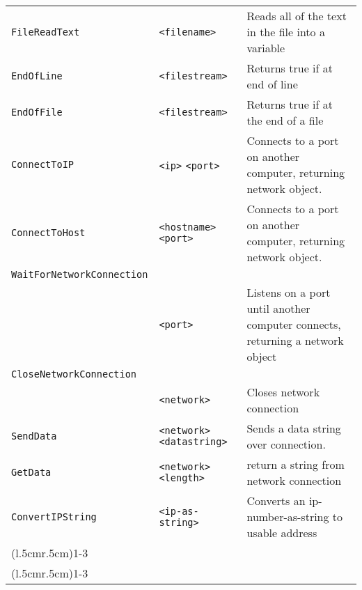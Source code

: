 \begin{longtable}{p{3cm}p{3cm}p{6cm}}
\verb+FileReadText+ &\verb+<filename>+ &Reads all of the text in the file into a variable\\ 
\verb+EndOfLine+ &\verb+<filestream>+&Returns true if at end of line \\ 
\verb+EndOfFile+ &\verb+<filestream>+&Returns true if at the end of a file\\ 
\verb+ConnectToIP+ &\verb+<ip>+ \verb+<port>+&Connects to a port on another computer, returning network object.   \\
\verb+ConnectToHost+&\verb+<hostname>+ \verb+<port>+&Connects to a port on another computer, returning network object.\\
\verb+WaitForNetworkConnection+& & \\ 
& \verb+<port>+&Listens on a port until another computer connects, returning a network object\\
\verb+CloseNetworkConnection+& &\\
& \verb+<network>+& Closes network connection\\
\verb+SendData+&\verb+<network>+ \verb+<datastring>+&  Sends a data string over connection.\\
\verb+GetData+&\verb+<network>+ \verb+<length>+&return a string from network connection\\
\verb+ConvertIPString+&\verb+<ip-as-string>+&Converts an
ip-number-as-string to usable address \\

\addlinespace[0.2cm] 

\cmidrule(l{.5cm}r{.5cm}){1-3} 
\multicolumn{3}{c}{\textbf{Graphical Objects Functions}}\\ 
\cmidrule(l{.5cm}r{.5cm}){1-3} 


\end{longtable}
